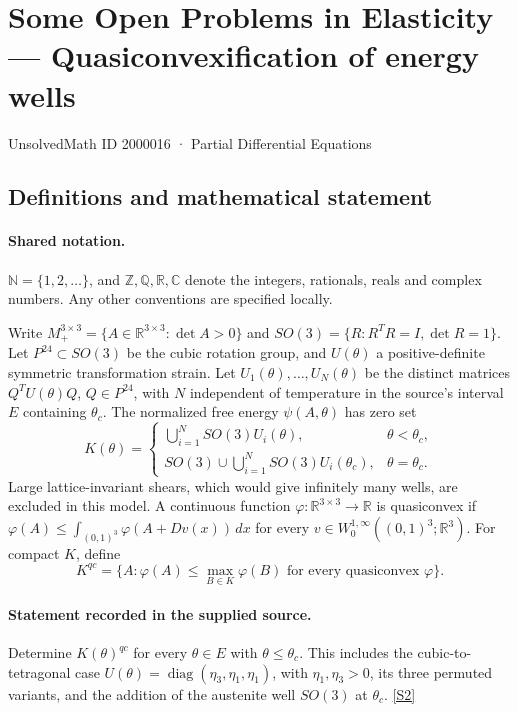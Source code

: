 \documentclass[11pt]{article}
\newcommand{\sref}[2]{\hyperlink{source:#1:#2}{[S#2]}}
\begin{document}
\setcounter{section}{2000015}
\section{Some Open Problems in Elasticity — Quasiconvexification of energy wells}\label{2000016}
{\small\sffamily UnsolvedMath ID 2000016 · Partial Differential Equations}
\subsection{Definitions and mathematical statement}

\paragraph{Shared notation.}$\mathbb N=\{1,2,\ldots\}$, and $\mathbb Z,\mathbb Q,\mathbb R,\mathbb C$ denote the integers, rationals, reals and complex numbers. Any other conventions are specified locally.


Write $M_+^{3\times3}=\{A\in\mathbb R^{3\times3}:\det A>0\}$ and $SO(3)=\{R:R^TR=I,\det R=1\}$. Let $P^{24}\subset SO(3)$ be the cubic rotation group, and $U(\theta)$ a positive-definite symmetric transformation strain. Let $U_1(\theta),\ldots,U_N(\theta)$ be the distinct matrices $Q^TU(\theta)Q$, $Q\in P^{24}$, with $N$ independent of temperature in the source's interval $E$ containing $\theta_c$. The normalized free energy $\psi(A,\theta)$ has zero set \[K(\theta)=\begin{cases}\displaystyle\bigcup_{i=1}^N SO(3)U_i(\theta),&\theta<\theta_c,\\\displaystyle SO(3)\cup\bigcup_{i=1}^N SO(3)U_i(\theta_c),&\theta=\theta_c.\end{cases}\] Large lattice-invariant shears, which would give infinitely many wells, are excluded in this model. A continuous function $\varphi:\mathbb R^{3\times3}\to\mathbb R$ is quasiconvex if $\varphi(A)\le\int_{(0,1)^3}\varphi(A+Dv(x))\,dx$ for every $v\in W^{1,\infty}_0((0,1)^3;\mathbb R^3)$. For compact $K$, define \[K^{qc}=\{A:\varphi(A)\le\max_{B\in K}\varphi(B)\text{ for every quasiconvex }\varphi\}.\]
\paragraph{Statement recorded in the supplied source.}
Determine $K(\theta)^{qc}$ for every $\theta\in E$ with $\theta\le\theta_c$. This includes the cubic-to-tetragonal case $U(\theta)=\operatorname{diag}(\eta_3,\eta_1,\eta_1)$, with $\eta_1,\eta_3>0$, its three permuted variants, and the addition of the austenite well $SO(3)$ at $\theta_c$. \sref{2000016}{2}
\end{document}
